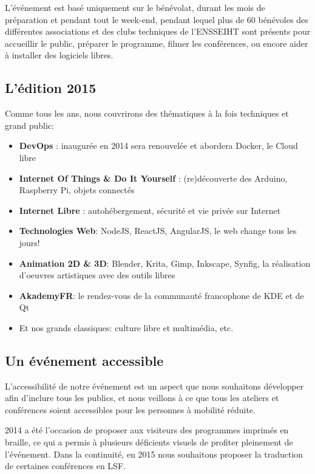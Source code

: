 \Separateur

L'événement est basé uniquement sur le bénévolat, durant les mois 
de préparation et pendant tout le week-end, pendant lequel plus de 60 
bénévoles des différentes associations et des clubs techniques de l'ENSSEIHT
sont présents pour accueillir le public, préparer le 
programme, filmer les conférences, ou encore aider à installer des 
logiciels libres.

\subsection{L'édition 2015}

Comme tous les ans, nous couvrirons des thématiques à la fois techniques et grand 
public:

\begin{itemize}[label=$\bullet$]
\item \textbf{DevOps} : inaugurée en 2014 sera renouvelée et abordera Docker, le Cloud libre
\item \textbf{Internet Of Things \& Do It Yourself} : (re)découverte des Arduino, Raspberry Pi, objets connectés
\item \textbf{Internet Libre} : autohébergement, sécurité et vie privée sur Internet
\item \textbf{Technologies Web}: NodeJS, ReactJS, AngularJS, le web change tous les jours!
\item \textbf{Animation 2D \& 3D}: Blender, Krita, Gimp, Inkscape, Synfig, la réalisation d'oeuvres artistiques avec des outils libres
\item \textbf{AkademyFR}: le rendez-vous de la communauté francophone de KDE et de Qt
\item Et nos grands classiques: culture libre et multimédia, etc.
\end{itemize}

\subsection{Un événement accessible}

\begin{minipage}{0.38\textwidth}
\begin{center}
\end{center}
\end{minipage}
\begin{minipage}{0.62\textwidth}
L'accessibilité de notre événement est un aspect que nous souhaitons 
développer afin d'inclure tous les publics, et nous veillons à ce que 
tous les ateliers et conférences soient accessibles pour les personnes 
à mobilité réduite.

2014 a été l'occasion de proposer aux visiteurs des programmes 
imprimés en braille, ce qui a permis à plusieurs déficients visuels 
de profiter pleinement de l'événement. Dans la continuité, en 2015 
nous souhaitons proposer la traduction de certaines conférences en LSF.
\end{minipage}

